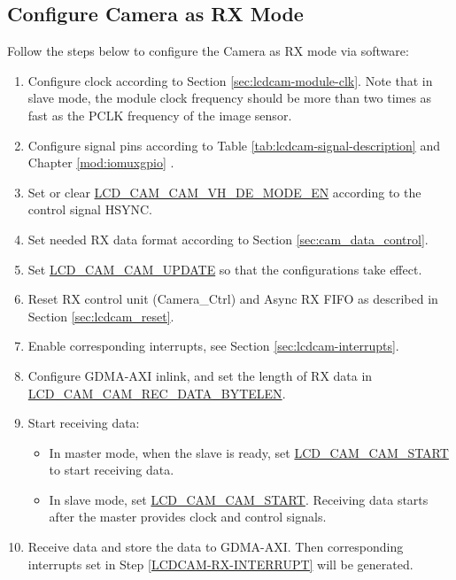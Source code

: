 \documentclass[main\_\_EN.tex]{subfiles}
\begin{document}
\subsection{Configure Camera as RX Mode}

Follow the steps below to configure the Camera as RX mode via software:

\begin{enumerate}
    \item Configure clock according to Section \ref{sec:lcdcam-module-clk}. Note that in slave mode, the module clock frequency should be more than two times as fast as the PCLK frequency of the image sensor.

    \item Configure signal pins according to Table \ref{tab:lcdcam-signal-description} and Chapter \ref{mod:iomuxgpio} \textit{}.

    \item Set or clear  \hyperref[fielddesc:LCDCAMCAMVHDEMODEEN]{LCD\_CAM\_CAM\_VH\_DE\_MODE\_EN} according to the control signal HSYNC.

    \item Set needed RX data format according to Section \ref{sec:cam_data_control}.
    \item Set \hyperref[fielddesc:LCDCAMCAMUPDATE]{LCD\_CAM\_CAM\_UPDATE} so that the configurations take effect.

    \item Reset RX control unit (Camera\_Ctrl) and Async RX FIFO as described in Section \ref{sec:lcdcam_reset}.
    \item Enable corresponding interrupts, see Section  \ref{sec:lcdcam-interrupts}.\label{LCDCAM-RX-INTERRUPT}

    \item Configure GDMA-AXI inlink, and set the length of RX data in \hyperref[fielddesc:LCDCAMCAMRECDATABYTELEN]{LCD\_CAM\_CAM\_REC\_DATA\_BYTELEN}.

    \item Start receiving data:
    \begin{itemize}
        \item In master mode, when the slave is ready, set \hyperref[fielddesc:LCDCAMCAMSTART]{LCD\_CAM\_CAM\_START} to start receiving data.
        \item In slave mode, set \hyperref[fielddesc:LCDCAMCAMSTART]{LCD\_CAM\_CAM\_START}. Receiving data starts after the master provides clock and control signals.
    \end{itemize}
    \item Receive data and store the data to GDMA-AXI. Then corresponding interrupts set in Step \ref{LCDCAM-RX-INTERRUPT} will be generated.

\end{enumerate}
\end{document}

